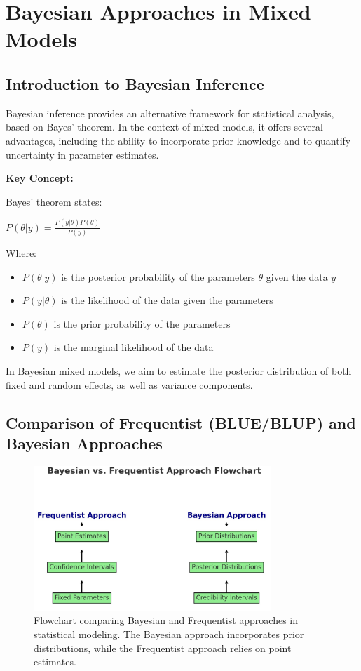 \documentclass[12pt,a4paper]{article}
\newenvironment{keyconceptbox}[1][]
{\begin{basebox}[linecolor=uqblue]
\textbf{\color{uqblue}Key Concept:} \textit{#1}\par\noindent\ignorespaces}
{\end{basebox}}
\begin{document}
\section{Bayesian Approaches in Mixed Models}

\subsection{Introduction to Bayesian Inference}

Bayesian inference provides an alternative framework for statistical analysis, based on Bayes' theorem. In the context of mixed models, it offers several advantages, including the ability to incorporate prior knowledge and to quantify uncertainty in parameter estimates.

\begin{keyconceptbox}
Bayes' theorem states:

$P(\theta|y) = \frac{P(y|\theta)P(\theta)}{P(y)}$

Where:
\begin{itemize}
    \item $P(\theta|y)$ is the posterior probability of the parameters $\theta$ given the data $y$
    \item $P(y|\theta)$ is the likelihood of the data given the parameters
    \item $P(\theta)$ is the prior probability of the parameters
    \item $P(y)$ is the marginal likelihood of the data
\end{itemize}
\end{keyconceptbox}

In Bayesian mixed models, we aim to estimate the posterior distribution of both fixed and random effects, as well as variance components.

\subsection{Comparison of Frequentist (BLUE/BLUP) and Bayesian Approaches}

\begin{figure}[h]
    \centering
    \includegraphics[width=0.8\textwidth]{bayesianFreq_FC.jpg}
    \caption{Flowchart comparing Bayesian and Frequentist approaches in statistical modeling. The Bayesian approach incorporates prior distributions, while the Frequentist approach relies on point estimates.}
    \label{fig:bayesian-vs-frequentist-flowchart}
\end{figure}
\end{document}
